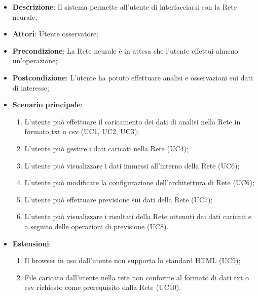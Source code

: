 \begin{itemize}
\item \textbf{Descrizione}: Il sistema permette all'utente di interfacciarsi con la Rete neurale;
\item \textbf{Attori}: Utente osservatore;
\item \textbf{Precondizione}: La Rete neurale \`e in attesa che l'utente effettui almeno un'operazione;
\item \textbf{Postcondizione}: L'utente ha potuto effettuare analisi e osservazioni sui dati di interesse;
\item \textbf{Scenario principale}:
\begin{enumerate}
\item L'utente pu\`o effettuare il caricamento dei dati di analisi nella Rete in formato txt o csv (UC1, UC2, UC3);
\item L'utente pu\`o gestire i dati caricati nella Rete (UC4);
\item L'utente pu\`o visualizzare i dati immessi all'interno della Rete (UC6);
\item L'utente pu\`o modificare la configurazione dell'architettura di Rete (UC6);
\item L'utente pu\`o effettuare  previsione sui dati della Rete (UC7);
\item L'utente pu\`o visualizzare i risultati della Rete ottenuti dai dati caricati e a seguito delle operazioni di previsione (UC8).
\end{enumerate}
\item \textbf{Estensioni}:
\begin{enumerate}
\item Il browser in uso dall'utente non supporta lo standard HTML (UC9);
\item File caricato dall'utente nella rete non conforme al formato di dati txt o csv richiesto come prerequisito dalla Rete (UC10).
\end{enumerate}
\end{itemize}

